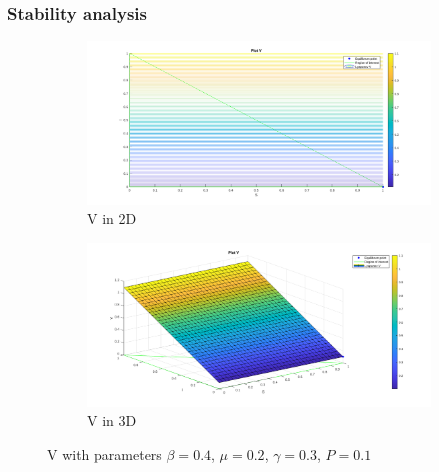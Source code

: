 \subsubsection{Stability analysis}

\begin{figure}[h!]
    \centering
    \label{fig:lyapunov_r0_minor_1}
    \begin{subfigure}{\textwidth}
        \centering
        \includegraphics[width=\linewidth]{Figure/lyapunov_2d_R0_minor_1.png}  
        \caption{V in 2D}
        \label{fig:lyapunov_r0_minor_1_first}
    \end{subfigure}
    \begin{subfigure}{\textwidth}
        \centering
        \includegraphics[width=\linewidth]{Figure/lyapunov_3d_R0_minor_1.png}  
        \caption{V in 3D}
        \label{fig:lyapunov_r0_minor_1_second}
    \end{subfigure}
    \caption{V with parameters $\beta = 0.4$, $\mu = 0.2$, $\gamma = 0.3$, $P = 0.1$}
\end{figure}

